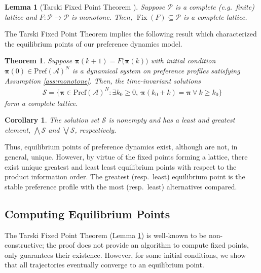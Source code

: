 \documentclass[conference]{ieeeconf}
\newcommand{\A}{\mathcal{A}}
\renewcommand{\P}{\mathcal{P}}
\renewcommand{\S}{\mathcal{S}}
\newcommand{\Pref}{\mathrm{Pref}}
\newcommand{\bigjoin}{\bigvee}
\newcommand{\bigmeet}{\bigwedge}
\renewcommand{\geq}{\geqslant}
\DeclareMathOperator{\Fix}{Fix}
\newtheorem{theorem}{Theorem}
\newtheorem{lemma}{Lemma}
\newtheorem{corollary}{Corollary}
\begin{document}
\begin{lemma}[Tarski Fixed Point Theorem \cite{tarski}] \label{lem:tfpt}
    Suppose $\P$ is a complete (e.g.~finite) lattice and $F: \P \to \P$ is monotone. Then, $\Fix(F) \subseteq \P$ is a complete lattice.
\end{lemma}

The Tarski Fixed Point Theorem implies the following result which characterized the equilibrium points of our preference dynamics model.

\begin{theorem}
    Suppose $\boldsymbol{\pi}(k+1) = F \bigl( \boldsymbol{\pi}(k) \bigr)$ with initial condition $\boldsymbol{\pi}(0) \in \Pref(\A)^N$ is a dynamical system on preference profiles satisfying Assumption \ref{ass:monotone}. Then, the time-invariant solutions
    \begin{align*}
        \mathcal{S} = \{ \boldsymbol{\pi} \in \Pref(\A)^N: \exists k_0 \geq 0,~\boldsymbol{\pi}(k_0+k) = \boldsymbol{\pi}~\forall~k \geq k_0 \}
    \end{align*}
    form a complete lattice.
\end{theorem}
\begin{corollary}
    The solution set $\S$ is nonempty and has a least and greatest element, $\bigmeet \S$ and $\bigjoin \S$, respectively.
\end{corollary}

Thus, equilibrium points of preference dynamics exist, although are not, in general, unique. However, by virtue of the fixed points forming a lattice, there exist unique greatest and least least equilibrium points with respect to the product information order. The greatest (resp.~least) equilibrium point is the stable preference profile with the most (resp.~least) alternatives compared.

\subsection{Computing Equilibrium Points}



The Tarski Fixed Point Theorem (Lemma \ref{lem:tfpt}) is well-known to be non-constructive; the proof does not provide an algorithm to compute fixed points, only guarantees their existence. However, for some initial conditions, we show that all trajectories eventually converge to an equilibrium point.

\end{document}
